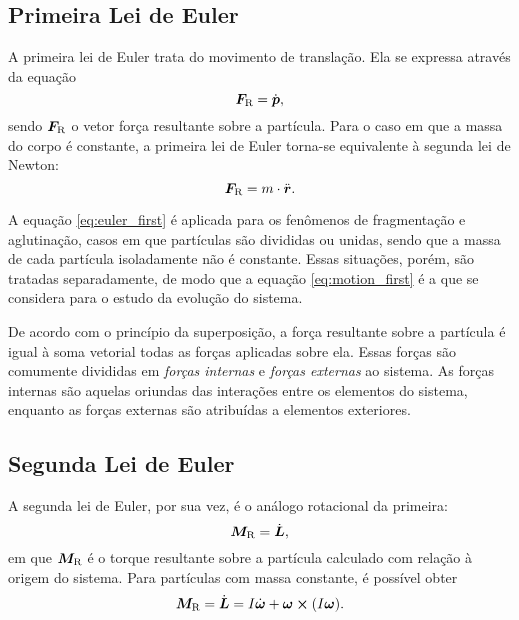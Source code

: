 \subsection{Primeira Lei de Euler}

A primeira lei de Euler trata do movimento de translação. Ela se expressa através da equação
\begin{equation} \label{eq:euler_first}
	\resultingForce = \deriv{1}{\linearMomentum},
\end{equation}
sendo \(\bm{F}_{\text{R}}\) o vetor força resultante sobre a partícula. Para o caso em que a massa do corpo é constante, a primeira lei de Euler torna-se equivalente à segunda lei de Newton:
\begin{equation} \label{eq:motion_first}
	\resultingForce = \mass\cdot\acceleration.
\end{equation}

A equação \eqref{eq:euler_first} é aplicada para os fenômenos de fragmentação e aglutinação, casos em que partículas são divididas ou unidas, sendo que a massa de cada partícula isoladamente não é constante. Essas situações, porém, são tratadas separadamente, de modo que a equação \eqref{eq:motion_first} é a que se considera para o estudo da evolução do sistema.

De acordo com o princípio da superposição, a força resultante sobre a partícula é igual à soma vetorial todas as forças aplicadas sobre ela. Essas forças são comumente divididas em \textit{forças internas} e \textit{forças externas} ao sistema. As forças internas são aquelas oriundas das interações entre os elementos do sistema, enquanto as forças externas são atribuídas a elementos exteriores.

\subsection{Segunda Lei de Euler}

A segunda lei de Euler, por sua vez, é o análogo rotacional da primeira:
\begin{equation*} %
	\resultingTorque = \deriv{1}{\angularMomentum},
\end{equation*}
em que \(\bm{M}_{\text{R}}\) é o torque resultante sobre a partícula calculado com relação à origem do sistema. Para partículas com massa constante, é possível obter
\begin{equation} \label{eq:motion_second}
	\resultingTorque = \deriv{1}{\angularMomentum} = \momentOfInertia\deriv{1}{\angularVelocity} + \angularVelocity\cross\pqty{\momentOfInertia\angularVelocity}.
\end{equation}

